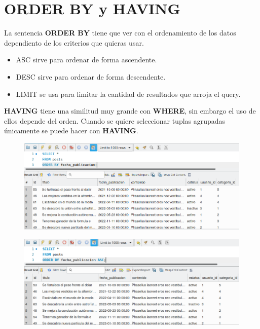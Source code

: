 \documentclass{article}
\begin{document}
\section{ORDER BY y HAVING}%
La sentencia \textbf{ORDER BY} tiene que ver con el ordenamiento de los datos
dependiento de los criterios que quieras usar.\\

\begin{itemize}
  \item ASC sirve para ordenar de forma ascendente.
  \item DESC sirve para ordenar de forma descendente.
  \item LIMIT se usa para limitar la cantidad de resultados que arroja el query.
\end{itemize}

\textbf{HAVING} tiene una similitud muy grande con \textbf{WHERE}, sin embargo
el uso de ellos depende del orden. Cuando se quiere seleccionar tuplas
agrupadas únicamente se puede hacer con \textbf{HAVING}.

\begin{figure}[h!]
  \centering
  \includegraphics[scale=0.75]{./Pictures/122_order_by.png}
\end{figure}

\begin{figure}[h!]
  \centering
  \includegraphics[scale=0.75]{./Pictures/123_order_by_asc.png}
\end{figure}
\end{document}
